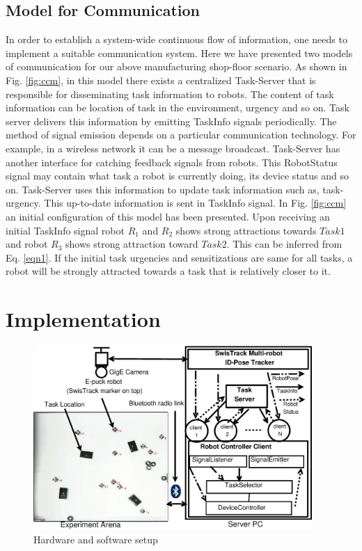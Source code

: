 \documentclass{llncs}
\begin{document}
\subsection{Model for Communication}
In order to establish a system-wide continuous flow of information, one needs to implement a suitable communication system. Here we have presented two models of communication for our above manufacturing shop-floor scenario.
As shown in Fig. \ref{fig:ccm}, in this model there exists a centralized Task-Server that is responsible for disseminating task information to robots. The content of task information can be location of task in the environment, urgency and so on. Task server delivers this information by emitting TaskInfo signals periodically. The method of signal emission depends on a particular communication technology. For example, in a wireless network it can be a message broadcast.
Task-Server has another interface for catching feedback signals from robots. This RobotStatus signal may contain what task a robot is currently doing, its device status and so on. Task-Server uses this information to update task information such as, task-urgency. This up-to-date information is sent in TaskInfo signal.
In Fig. \ref{fig:ccm} an initial configuration of this model has been presented. Upon receiving an initial TaskInfo signal robot $R_1$ and $R_2$ shows strong attractions towards $Task1$ and robot $R_3$ shows strong attraction toward $Task2$. This can be inferred from Eq. \ref{eqn1}. If the initial task urgencies and sensitizations are same for all tasks, a robot will be strongly attracted towards a task that is relatively closer to it.
\section{Implementation}
\label{sec:impl}
\begin{figure}
\centering
\includegraphics[height=7cm, angle=0]
{../dia-files/RIL-Expt-Setup1.eps}
\caption{\small Hardware and software setup}
\label{fig:setup} %
\end{figure}
 
\end{document}
